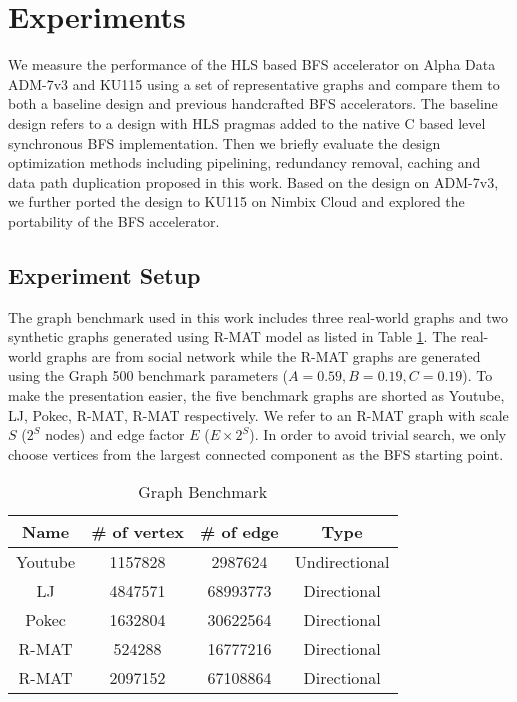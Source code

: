 \section{Experiments} \label{sec:experiment}

We measure the performance of the HLS based BFS 
accelerator on Alpha Data ADM-7v3 and KU115 using a set of 
representative graphs and compare them to both a 
baseline design and previous handcrafted BFS accelerators. 
The baseline design refers to a design with HLS pragmas 
added to the native C based level synchronous BFS implementation. 
Then we briefly evaluate the design optimization 
methods including pipelining, redundancy removal, 
caching and data path duplication 
proposed in this work. Based on the design on ADM-7v3, 
we further ported the design 
to KU115 on Nimbix Cloud and explored the portability of the 
BFS accelerator. 



\subsection{Experiment Setup}
The graph benchmark used in this work includes three real-world graphs and 
two synthetic graphs generated using R-MAT model \cite{chakrabarti2004rmat} 
as listed in Table \ref{tab:graph}. The real-world graphs are from social network 
\cite{snapnets} while the R-MAT graphs are generated 
using the Graph 500 benchmark parameters ($A=0.59, B=0.19, C=0.19$). To make the 
presentation easier, the five benchmark graphs are shorted as Youtube, 
LJ, Pokec, R-MAT\uppercase\expandafter{}, 
R-MAT\uppercase\expandafter{} respectively. We refer 
to an R-MAT graph with scale $S$ ($2^{S}$ nodes) and edge factor $E$ ($E\times 2^{S}$). 
In order to avoid trivial search, we only choose vertices from the largest 
connected component as the BFS starting point.



\begin{table}
	\centering
	\vspace{-0.3em}
	\caption{Graph Benchmark}
	\label{tab:graph}
	\vspace{-0.3em}
	\begin{tabular}{cccc}
		\toprule
		Name & \# of vertex & \# of edge & Type \\
		\midrule
		Youtube & 1157828 & 2987624 & Undirectional \\
		LJ & 4847571 & 68993773 & Directional \\
		Pokec & 1632804 & 30622564 & Directional \\
		R-MAT\uppercase\expandafter{\romannumeral1} & 524288 & 16777216 & Directional \\
		R-MAT\uppercase\expandafter{\romannumeral2} & 2097152 & 67108864 & Directional \\
		\bottomrule
	\end{tabular}
	\vspace{-1em}
\end{table}



